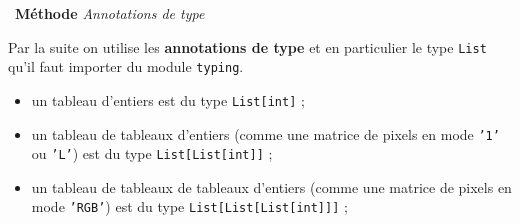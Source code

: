 \documentclass[a4paper, french, 12pt]{article}
\newenvironment{methode}[1]
{\par \medskip    \noindent  
 \begin {bclogo}[arrondi =0.1,logo=\bcoutil, marge=4,noborder = true] {~\textbf{Méthode}   {\itshape #1} }  \par}
{
\end{bclogo}
 \par \bigskip }
\begin{document}
\vspace*{-15pt}

\begin{methode}{Annotations de type}
Par la suite on utilise les \textbf{annotations de type} et en particulier le type \texttt{List}  qu'il faut importer du module \texttt{typing}.

\begin{itemize}[label=]
	\item un tableau d'entiers est du type \texttt{List[int]} ;
	\item un tableau de tableaux d'entiers (comme une matrice de pixels en mode \texttt{'1'} ou \texttt{'L'}) est du type \texttt{List[List[int]]}  ;
	\item un tableau de tableaux  de tableaux d'entiers (comme une matrice de pixels en mode \texttt{'RGB'}) est du type \texttt{List[List[List[int]]]}  ;
\end{itemize}


\end{methode}


\vspace*{-15pt}
\end{document}
